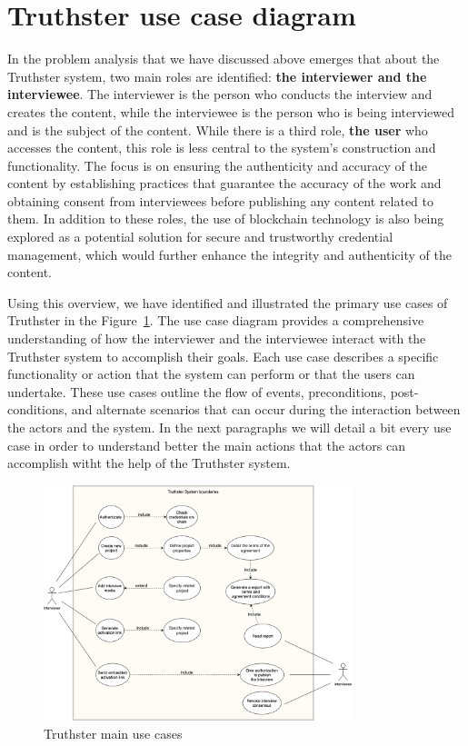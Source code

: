 \documentclass[target=mst,aauheader=]{thud}
\begin{document}
\section{Truthster use case diagram}

In the problem analysis that we have discussed above emerges that about the Truthster system, two main roles are identified: \textbf{the interviewer and the interviewee}. The interviewer is the person who conducts the interview and creates the content, while the interviewee is the person who is being interviewed and is the subject of the content.
While there is a third role, \textbf{the user} who accesses the content, this role is less central to the system's construction and functionality. The focus is on ensuring the authenticity and accuracy of the content by establishing practices that guarantee the accuracy of the work and obtaining consent from interviewees before publishing any content related to them.
In addition to these roles, the use of blockchain technology is also being explored as a potential solution for secure and trustworthy credential management, which would further enhance the integrity and authenticity of the content.\par

Using this overview, we have identified and illustrated the primary use cases of Truthster in the Figure~\ref{fig:useCaseDiagram}.
The use case diagram provides a comprehensive understanding of how the interviewer and the interviewee interact with the Truthster system to accomplish their goals. Each use case describes a specific functionality or action that the system can perform or that the users can undertake. These use cases outline the flow of events, preconditions, post-conditions, and alternate scenarios that can occur during the interaction between the actors and the system. In the next paragraphs we will detail a bit every use case in order to understand better the main actions that the actors can accomplish witht the help of the Truthster system.

\begin{figure}
    \centering
    \includegraphics[width=0.8\textwidth]{images/truthster_use_cases.png}
    \caption{Truthster main use cases}
    \label{fig:useCaseDiagram}
\end{figure}
\end{document}
